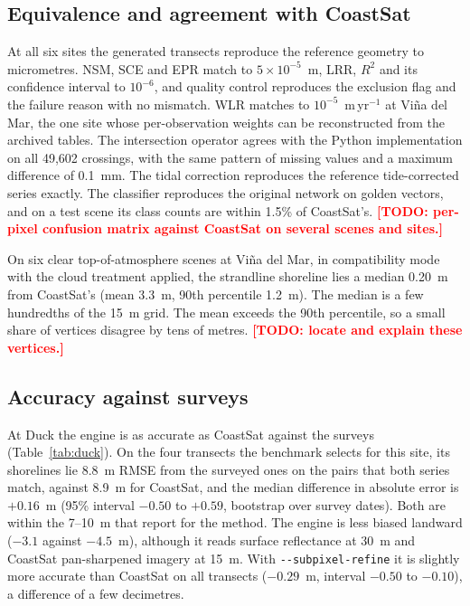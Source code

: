 \documentclass[authoryear,preprint,review,12pt]{elsarticle}
\newcommand{\todo}[1]{\textcolor{red}{\textbf{[TODO: #1]}}}
\begin{document}
\subsection{Equivalence and agreement with CoastSat}\label{subsec:equivalence}
At all six sites the generated transects reproduce the reference geometry to
micrometres. NSM, SCE and EPR match to $5\times10^{-5}$~m, LRR, $R^2$ and its
confidence interval to $10^{-6}$, and quality control reproduces the exclusion
flag and the failure reason with no mismatch. WLR matches to
$10^{-5}$~m\,yr$^{-1}$ at Vi\~na del Mar, the one site whose per-observation
weights can be reconstructed from the archived tables.
The intersection operator agrees with the Python implementation on all 49,602
crossings, with the same pattern of missing values and a maximum difference of
0.1~mm. The tidal correction reproduces the reference tide-corrected series
exactly. The classifier reproduces the original network on golden vectors, and
on a test scene its class counts are within 1.5\% of CoastSat's.
\todo{per-pixel confusion matrix against CoastSat on several scenes and sites.}

On six clear top-of-atmosphere scenes at Vi\~na del Mar, in compatibility mode
with the cloud treatment applied, the strandline shoreline lies a median 0.20~m
from CoastSat's (mean 3.3~m, 90th percentile 1.2~m). The median is a few
hundredths of the 15~m grid. The mean exceeds the 90th percentile, so a small
share of vertices disagree by tens of metres. \todo{locate and explain these
vertices.}

\subsection{Accuracy against surveys}\label{subsec:res_surveys}
At Duck the engine is as accurate as CoastSat against the surveys
(Table~\ref{tab:duck}). On the four transects the benchmark selects for this
site, its shorelines lie 8.8~m RMSE from the surveyed ones on the pairs that
both series match, against 8.9~m for CoastSat, and the median difference in
absolute error is $+0.16$~m (95\% interval $-0.50$ to $+0.59$, bootstrap over
survey dates). Both are within the 7--10~m that \citet{vos2023benchmark}
report for the method. The engine is less biased landward ($-3.1$ against
$-4.5$~m), although it reads surface reflectance at 30~m and CoastSat
pan-sharpened imagery at 15~m. With \texttt{-{}-subpixel-refine} it is slightly
more accurate than CoastSat on all transects ($-0.29$~m, interval $-0.50$ to
$-0.10$), a difference of a few decimetres.
\end{document}
